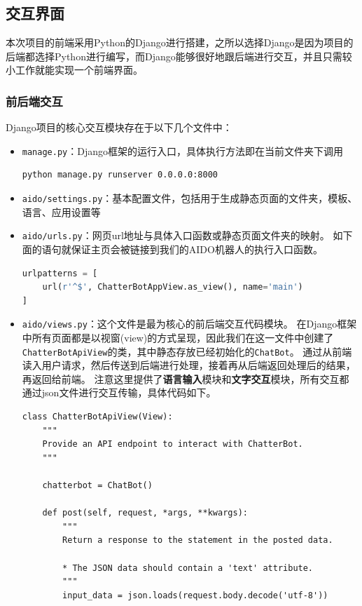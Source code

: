 \documentclass[logo,reportComp]{thesis}
\begin{document}
\subsection{交互界面} %
本次项目的前端采用Python的Django进行搭建，之所以选择Django是因为项目的后端都选择Python进行编写，而Django能够很好地跟后端进行交互，并且只需较小工作就能实现一个前端界面。

\subsubsection{前后端交互}
Django项目的核心交互模块存在于以下几个文件中：
\begin{itemize}
\item \verb'manage.py'：Django框架的运行入口，具体执行方法即在当前文件夹下调用
\begin{lstlisting}[language=bash]
python manage.py runserver 0.0.0.0:8000
\end{lstlisting}

\item \verb'aido/settings.py'：基本配置文件，包括用于生成静态页面的文件夹，模板、语言、应用设置等

\item \verb'aido/urls.py'：网页url地址与具体入口函数或静态页面文件夹的映射。
如下面的语句就保证主页会被链接到我们的AIDO机器人的执行入口函数。
\begin{lstlisting}[language=python]
urlpatterns = [
    url(r'^$', ChatterBotAppView.as_view(), name='main')
]
\end{lstlisting}

\item \verb'aido/views.py'：这个文件是最为核心的前后端交互代码模块。
在Django框架中所有页面都是以视窗(view)的方式呈现，因此我们在这一文件中创建了\verb'ChatterBotApiView'的类，其中静态存放已经初始化的\verb'ChatBot'。
通过从前端读入用户请求，然后传送到后端进行处理，接着再从后端返回处理后的结果，再返回给前端。
注意这里提供了\textbf{语言输入}模块和\textbf{文字交互}模块，所有交互都通过json文件进行交互传输，具体代码如下。
\begin{lstlisting}
class ChatterBotApiView(View):
    """
    Provide an API endpoint to interact with ChatterBot.
    """

    chatterbot = ChatBot()

    def post(self, request, *args, **kwargs):
        """
        Return a response to the statement in the posted data.

        * The JSON data should contain a 'text' attribute.
        """
        input_data = json.loads(request.body.decode('utf-8'))


\end{lstlisting}
\end{itemize}
\end{document}
